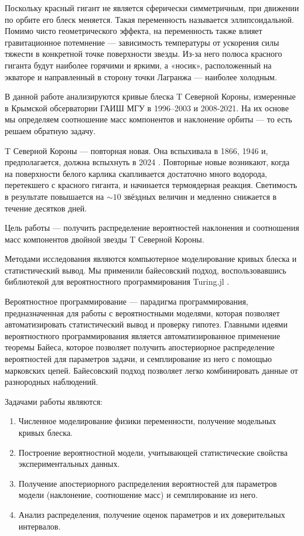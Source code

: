 Поскольку красный гигант не является сферически симметричным, при движении по орбите его блеск меняется. Такая переменность называется эллипсоидальной. Помимо чисто геометрического эффекта, на переменность также влияет гравитационное потемнение --- зависимость температуры от ускорения силы тяжести в конкретной точке поверхности звезды. Из-за него полюса красного гиганта будут наиболее горячими и яркими, а «носик», расположенный на экваторе и направленный в сторону точки Лагранжа --- наиболее холодным.

В данной работе анализируются кривые блеска T Северной Короны, измеренные в Крымской обсерватории ГАИШ МГУ в 1996--2003 и 2008-2021. На их основе мы определяем соотношение масс компонентов и наклонение орбиты — то есть решаем обратную задачу.

T Северной Короны --- повторная новая. Она вспыхивала в 1866, 1946 и, предполагается, должна вспыхнуть в 2024 \cite{OutburstAnnounce}. Повторные новые возникают, когда на поверхности белого карлика скапливается достаточно много водорода, перетекшего с красного гиганта, и начинается термоядерная реакция. Светимость в результате повышается на ${\sim} 10$ звёздных величин и медленно снижается в течение десятков дней.

Цель работы --- получить распределение вероятностей наклонения и соотношения масс компонентов двойной звезды T Северной Короны.

Методами исследования являются компьютерное моделирование кривых блеска и статистический вывод. Мы применили байесовский подход, воспользовавшись библиотекой для вероятностного программирования Turing.jl \cite{Turing}.

Вероятностное программирование --- парадигма программирования, предназначенная для работы с вероятностными моделями, которая позволяет автоматизировать статистический вывод и проверку гипотез. Главными идеями вероятностного программирования является автоматизированное применение теоремы Байеса, которое позволяет получить апостериорное распределение вероятностей для параметров задачи, и семплирование из него с помощью марковских цепей. Байесовский подход позволяет легко комбинировать данные от разнородных наблюдений.

Задачами работы являются:
\begin{enumerate}
    \item Численное моделирование физики переменности, получение модельных кривых блеска.
    \item Построение вероятностной модели, учитывающей статистические свойства экспериментальных данных.
    \item Получение апостериорного распределения вероятностей для параметров модели (наклонение, соотношение масс) и семплирование из него.
    \item Анализ распределения, получение оценок параметров и их доверительных интервалов.
\end{enumerate}

